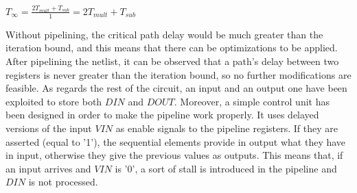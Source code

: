 \begin{center}
$T_{\infty} = \frac{2T_{mult} + T_{sub}}{1} = 2T_{mult} + T_{sub}$
\end{center}

\bigskip
Without pipelining, the critical path delay would be much greater than the iteration bound, and this means that there can be optimizations to be applied. After pipelining the netlist, it can be observed that a path's delay between two registers is never greater than the iteration bound, so no further modifications are feasible.
\newline
\newline
As regards the rest of the circuit, an input and an output one have been exploited to store both $DIN$ and $DOUT$. Moreover, a simple control unit has been designed in order to make the pipeline work properly. It uses delayed versions of the input $VIN$ as enable signals to the pipeline registers. If they are asserted (equal to '1'), the sequential elements provide in output what they have in input, otherwise they give the previous values as outputs. This means that, if an input arrives and $VIN$ is '0', a sort of stall is introduced in the pipeline and $DIN$ is not processed.

